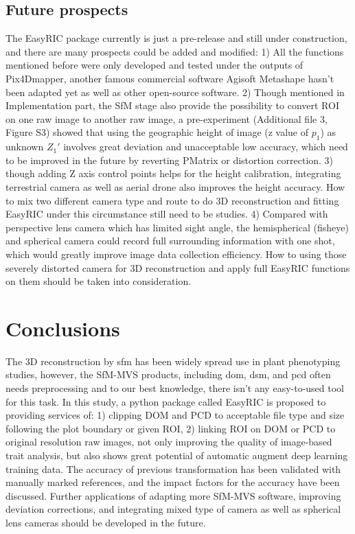 \documentclass[doublespacing]{configs/bmcart}
\begin{document}
\subsection*{Future prospects}
The EasyRIC package currently is just a pre-release and still under construction, and there are many prospects could be added and modified: 1) All the functions mentioned before were only developed and tested under the outputs of Pix4Dmapper, another famous commercial software Agisoft Metashape hasn't been adapted yet as well as other open-source software. 2) Though mentioned in Implementation part, the SfM stage also provide the possibility to convert ROI on one raw image to another raw image, a pre-experiment (Additional file 3, Figure S3) showed that using the geographic height of image (z value of $p_1$) as unknown $Z_1'$ involves great deviation and unacceptable low accuracy, which need to be improved in the future by reverting PMatrix or distortion correction. 3) though adding Z axis control points helps for the height calibration, integrating terrestrial camera as well as aerial drone also improves the height accuracy. How to mix two different camera type and route to do 3D reconstruction and fitting EasyRIC under this circumstance still need to be studies. 4) Compared with perspective lens camera which has limited sight angle, the hemispherical (fisheye) and spherical camera could record full surrounding information with one shot, which would greatly improve image data collection efficiency. How to using those severely distorted camera for 3D reconstruction and apply full EasyRIC functions on them should be taken into consideration.

\section*{Conclusions}
The 3D reconstruction by \acrshort*{sfm} has been widely spread use in plant phenotyping studies, however, the SfM-MVS products, including \acrshort*{dom}, \acrshort*{dsm}, and \acrshort*{pcd} often needs preprocessing and to our best knowledge, there isn't any easy-to-used tool for this task. In this study, a python package called EasyRIC is proposed to providing services of: 1) clipping  DOM and PCD to acceptable file type and size following the plot boundary or given ROI, 2) linking ROI on DOM or PCD to original resolution raw images, not only improving the quality of image-based trait analysis, but also shows great potential of automatic augment deep learning training data. The accuracy of previous transformation has been validated with manually marked references, and the impact factors for the accuracy have been discussed. Further applications of adapting more SfM-MVS software, improving deviation corrections, and integrating mixed type of camera as well as spherical lens cameras should be developed in the future.
\end{document}
